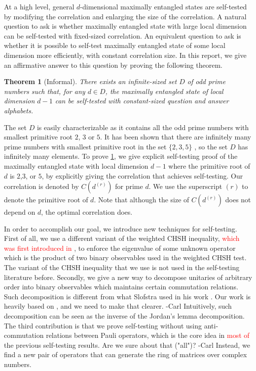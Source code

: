 \documentclass[11pt,letterpaper]{article}
\newcommand{\1}{\mathbb{1}}
\newcommand{\dr}[1]{d^{(#1)}}
\def\carl#1{{\color{blue} #1 -Carl}}
\newcommand{\hf}[1]{\textcolor{red}{#1}}
\newtheorem{theorem}{Theorem}[section]
\theoremstyle{definition}
\begin{document}
At a high level, general $d$-dimensional maximally entangled states are self-tested by
modifying the correlation and enlarging the size of the correlation.
A natural question to ask is whether maximally entangled state with large local dimension
can be self-tested with fixed-sized correlation. 
An equivalent question to ask is whether it is possible to self-test maximally
entangled state of some local dimension more efficiently, with constant correlation size. 
In this report, we give an affirmative answer to this question by proving the following theorem.
\begin{theorem}[Informal]
\label{thm:inf}
	There exists an infinite-sized set $D$ of odd prime numbers such that, for any $d \in D$, 
	the maximally entangled state of local dimension $d-1$ can be self-tested 
	with constant-sized question and answer alphabets.
\end{theorem}

The set $D$ is easily characterizable as it contains all the odd prime numbers with smallest
primitive root $2$, $3$ or $5$. It has been shown that there are infinitely many prime numbers
with smallest primitive root in the set $\{2,3,5\}$ \cite{murty1988}, so the set $D$ has infinitely many elements.
To prove \cref{thm:inf}, we give explicit self-testing proof of 
the maximally entangled state with local dimension $d-1$ where the primitive root of $d$ is $2$,$3$, or $5$, 
by explicitly giving the correlation that achieves self-testing. 
Our correlation is denoted by $C(\dr{r})$ for prime $d$.
We use the superscript $(r)$ to denote the primitive root of $d$.
Note that although the size of $C(\dr{r})$ does not depend on $d$, the optimal correlation does.


In order to accomplish our goal, we introduce new techniques for self-testing.
First of all, we use a different variant of the weighted CHSH inequality, \hf{which was first introduced in \cite{acin2012}}, to enforce the eigenvalue of
some unknown operator which is the product of two binary observables used in the weighted CHSH test.
The variant of the CHSH inequality that we use is not used in the self-testing literature before.
Secondly, we give a new way to decompose unitaries of arbitrary order into binary observables which maintains
certain commutation relations. Such decomposition is different from what Slofstra used in his work \cite{slofstra2017}.
\carl{Our work is heavily based on \cite{slofstra2017}, and we need to make that clearer.}
Intuitively, such decomposition can be seen as the inverse of the Jordan's lemma decomposition.
The third contribution is that we prove self-testing without using anti-commutation relations between Pauli operators, 
which is the core idea in \hf{most of} the previous self-testing results.
\carl{Are we sure about that ("all")?}
Instead, we find a new pair of operators that can generate the ring of matrices over complex numbers.
\end{document}
